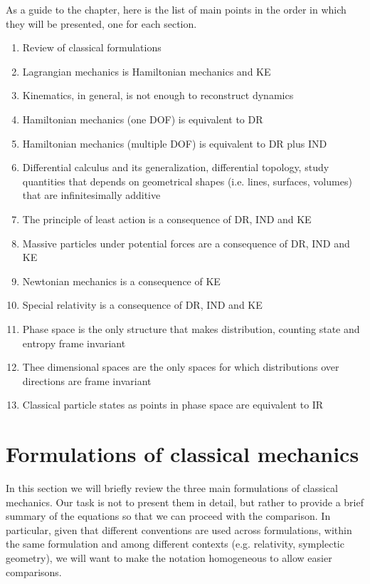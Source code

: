 As a guide to the chapter, here is the list of main points in the order in which they will be presented, one for each section.
\begin{enumerate}
	\item Review of classical formulations
	\item Lagrangian mechanics is Hamiltonian mechanics and KE
	\item Kinematics, in general, is not enough to reconstruct dynamics
	\item Hamiltonian mechanics (one DOF) is equivalent to DR
	\item Hamiltonian mechanics (multiple DOF) is equivalent to DR plus IND
	\item Differential calculus and its generalization, differential topology, study quantities that depends on geometrical shapes (i.e. lines, surfaces, volumes) that are infinitesimally additive
	\item The principle of least action is a consequence of DR, IND and KE
	\item Massive particles under potential forces are a consequence of DR, IND and KE
	\item Newtonian mechanics is a consequence of KE
	\item Special relativity is a consequence of DR, IND and KE
	\item Phase space is the only structure that makes distribution, counting state and entropy frame invariant
	\item Thee dimensional spaces are the only spaces for which distributions over directions are frame invariant
	\item Classical particle states as points in phase space are equivalent to IR
\end{enumerate}

\section{Formulations of classical mechanics}

In this section we will briefly review the three main formulations of classical mechanics. Our task is not to present them in detail, but rather to provide a brief summary of the equations so that we can proceed with the comparison. In particular, given that different conventions are used across formulations, within the same formulation and among different contexts (e.g. relativity, symplectic geometry), we will want to make the notation homogeneous to allow easier comparisons.

